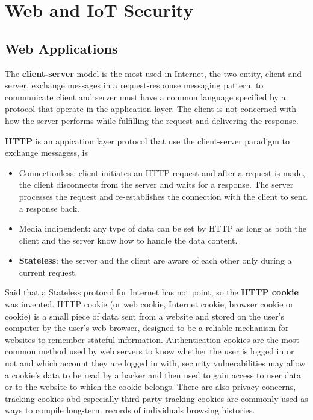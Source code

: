 \section{Web and IoT Security}
\subsection{Web Applications}
The \textbf{client-server} model is the most used in Internet, the two entity, client and server, exchange messages in a request-response messaging pattern, to communicate client and server must have a common language specified by a protocol that operate in the application layer. The client is not concerned with how the server performs while fulfilling the request and delivering the response.

\textbf{HTTP} is an appication layer protocol that use the client-server paradigm to exchange messagess, is \begin{itemize}
    \item Connectionless: client initiates an HTTP request and after a request is made, the client disconnects from the server and waits for a response. The server processes the request and re-establishes the connection with the client to send a response back.
    \item Media indipendent: any type of data can be set by HTTP as long as both the client and the server know how to handle the data content.
    \item \textbf{Stateless}: the server and the client are aware of each other only during a current request.
\end{itemize}
 Said that a Stateless protocol for Internet has not point, so the \textbf{HTTP cookie} was invented. HTTP cookie (or web cookie, Internet cookie, browser cookie or cookie) is a small piece of data sent from a website and stored on the user's computer by the user's web browser, designed to be a reliable mechanism for websites to remember stateful information. Authentication cookies are the most common method used by web servers to know whether the user is logged in or not and which account they are logged in with, security vulnerabilities may allow a cookie's data to be read by a hacker and then used to gain access to user data or to the website to which the cookie belongs. There are also privacy concerns, tracking cookies abd especially third-party tracking cookies are commonly used as ways to compile long-term records of individuals browsing histories.

